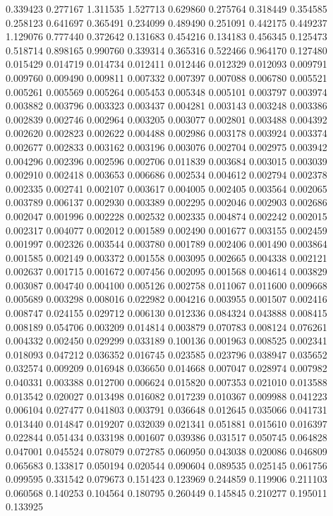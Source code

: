 0.339423
0.277167
1.311535
1.527713
0.629860
0.275764
0.318449
0.354585
0.258123
0.641697
0.365491
0.234099
0.489490
0.251091
0.442175
0.449237
1.129076
0.777440
0.372642
0.131683
0.454216
0.134183
0.456345
0.125473
0.518714
0.898165
0.990760
0.339314
0.365316
0.522466
0.964170
0.127480
0.015429
0.014719
0.014734
0.012411
0.012446
0.012329
0.012093
0.009791
0.009760
0.009490
0.009811
0.007332
0.007397
0.007088
0.006780
0.005521
0.005261
0.005569
0.005264
0.005453
0.005348
0.005101
0.003797
0.003974
0.003882
0.003796
0.003323
0.003437
0.004281
0.003143
0.003248
0.003386
0.002839
0.002746
0.002964
0.003205
0.003077
0.002801
0.003488
0.004392
0.002620
0.002823
0.002622
0.004488
0.002986
0.003178
0.003924
0.003374
0.002677
0.002833
0.003162
0.003196
0.003076
0.002704
0.002975
0.003942
0.004296
0.002396
0.002596
0.002706
0.011839
0.003684
0.003015
0.003039
0.002910
0.002418
0.003653
0.006686
0.002534
0.004612
0.002794
0.002378
0.002335
0.002741
0.002107
0.003617
0.004005
0.002405
0.003564
0.002065
0.003789
0.006137
0.002930
0.003389
0.002295
0.002046
0.002903
0.002686
0.002047
0.001996
0.002228
0.002532
0.002335
0.004874
0.002242
0.002015
0.002317
0.004077
0.002012
0.001589
0.002490
0.001677
0.003155
0.002459
0.001997
0.002326
0.003544
0.003780
0.001789
0.002406
0.001490
0.003864
0.001585
0.002149
0.003372
0.001558
0.003095
0.002665
0.004338
0.002121
0.002637
0.001715
0.001672
0.007456
0.002095
0.001568
0.004614
0.003829
0.003087
0.004740
0.004100
0.005126
0.002758
0.011067
0.011600
0.009668
0.005689
0.003298
0.008016
0.022982
0.004216
0.003955
0.001507
0.002416
0.008747
0.024155
0.029712
0.006130
0.012336
0.084324
0.043888
0.008415
0.008189
0.054706
0.003209
0.014814
0.003879
0.070783
0.008124
0.076261
0.004332
0.002450
0.029299
0.033189
0.100136
0.001963
0.008525
0.002341
0.018093
0.047212
0.036352
0.016745
0.023585
0.023796
0.038947
0.035652
0.032574
0.009209
0.016948
0.036650
0.014668
0.007047
0.028974
0.007982
0.040331
0.003388
0.012700
0.006624
0.015820
0.007353
0.021010
0.013588
0.013542
0.020027
0.013498
0.016082
0.017239
0.010367
0.009988
0.041223
0.006104
0.027477
0.041803
0.003791
0.036648
0.012645
0.035066
0.041731
0.013440
0.014847
0.019207
0.032039
0.021341
0.051881
0.015610
0.016397
0.022844
0.051434
0.033198
0.001607
0.039386
0.031517
0.050745
0.064828
0.047001
0.045524
0.078079
0.072785
0.060950
0.043038
0.020086
0.046809
0.065683
0.133817
0.050194
0.020544
0.090604
0.089535
0.025145
0.061756
0.099595
0.331542
0.079673
0.151423
0.123969
0.244859
0.119906
0.211103
0.060568
0.140253
0.104564
0.180795
0.260449
0.145845
0.210277
0.195011
0.133925

